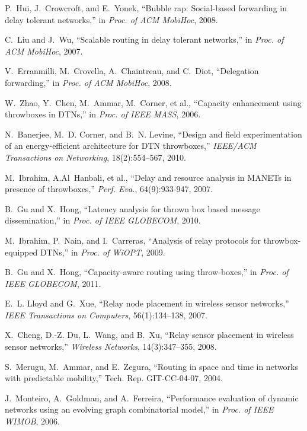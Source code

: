 \documentclass[10pt,conference,compsocconf,letterpaper]{IEEEtran}
\begin{document}
%
%
\begin{thebibliography}{10}

P.~Hui, J.~Crowcroft, and E.~Yonek, ``Bubble rap: Social-based forwarding in
  delay tolerant networks,'' in \emph{Proc. of ACM MobiHoc}, 2008.

C.~Liu and J.~Wu, ``Scalable routing in delay tolerant networks,'' in
  \emph{Proc. of ACM MobiHoc}, 2007.

V.~Erranmilli, M.~Crovella, A.~Chaintreau, and C.~Diot, ``Delegation
  forwarding,'' in \emph{Proc. of ACM MobiHoc}, 2008.

W.~Zhao, Y.~Chen, M.~Ammar, M.~Corner, et al., ``Capacity
  enhancement using throwboxes in {DTNs},'' in \emph{Proc. of IEEE  MASS}, 2006.

N.~Banerjee, M.~D. Corner, and B.~N. Levine,  ``Design and field experimentation of an energy-efficient architecture
  for {DTN} throwboxes,'' \emph{IEEE/ACM Transactions on Networking}, 18(2):554--567, 2010.

M.~Ibrahim, A.Al~Hanbali, et al., ``Delay and resource analysis in
  MANETs in presence of throwboxes,'' \emph{Perf. Eva.}, 64(9):933-947, 2007.

B.~Gu and X.~Hong, ``Latency analysis for thrown box based message
  dissemination,'' in \emph{Proc. of IEEE GLOBECOM}, 2010.

M.~Ibrahim, P.~Nain, and I.~Carreras, ``Analysis of relay protocols for
  throwbox-equipped {DTNs},'' in \emph{Proc. of WiOPT}, 2009.

B.~Gu and X.~Hong, ``Capacity-aware routing using throw-boxes,'' in \emph{Proc. of IEEE GLOBECOM}, 2011.

E.~L. Lloyd and G.~Xue, ``Relay node placement in wireless sensor networks,''
  \emph{IEEE Transactions on Computers}, 56(1):134--138, 2007.

X.~Cheng, D.-Z. Du, L.~Wang, and B.~Xu, ``Relay sensor placement in wireless
  sensor networks,'' \emph{Wireless Networks}, 14(3):347--355,
  2008.

S.~Merugu, M.~Ammar, and E.~Zegura, ``Routing in space and time in networks
  with predictable mobility,'' Tech. Rep. GIT-CC-04-07, 2004.

J.~Monteiro, A.~Goldman, and A.~Ferreira, ``Performance evaluation of dynamic
  networks using an evolving graph combinatorial model,'' in \emph{Proc. of IEEE WIMOB}, 2006.


\end{thebibliography}
\end{document}
